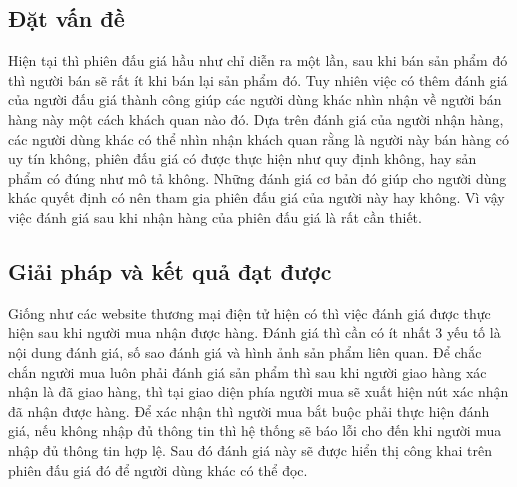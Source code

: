 \documentclass[../DoAn.tex]{subfiles}
\begin{document}
\subsection{Đặt vấn đề}
Hiện tại thì phiên đấu giá hầu như chỉ diễn ra một lần, sau khi bán sản phẩm đó thì người bán sẽ rất ít khi bán lại sản phẩm đó. Tuy nhiên việc có thêm đánh giá của người đấu giá thành công giúp các người dùng khác nhìn nhận về người bán hàng này một cách khách quan nào đó. Dựa trên đánh giá của người nhận hàng, các người dùng khác có thể nhìn nhận khách quan rằng là người này bán hàng có uy tín không, phiên đấu giá có được thực hiện như quy định không, hay sản phẩm có đúng như mô tả không. Những đánh giá cơ bản đó giúp cho người dùng khác quyết định có nên tham gia phiên đấu giá của người này hay không. Vì vậy việc đánh giá sau khi nhận hàng của phiên đấu giá là rất cần thiết. 
\subsection{Giải pháp và kết quả đạt được}
Giống như các website thương mại điện tử hiện có thì việc đánh giá được thực hiện sau khi người mua nhận được hàng. Đánh giá thì cần có ít nhất 3 yếu tố là nội dung đánh giá, số sao đánh giá và hình ảnh sản phẩm liên quan. Để chắc chắn người mua luôn phải đánh giá sản phẩm thì sau khi người giao hàng xác nhận là đã giao hàng, thì tại giao diện phía người mua sẽ xuất hiện nút xác nhận đã nhận được hàng. Để xác nhận thì người mua bắt buộc phải thực hiện đánh giá, nếu không nhập đủ thông tin thì hệ thống sẽ báo lỗi cho đến khi người mua nhập đủ thông tin hợp lệ. Sau đó đánh giá này sẽ được hiển thị công khai trên phiên đấu giá đó để người dùng khác có thể đọc.
\end{document}
